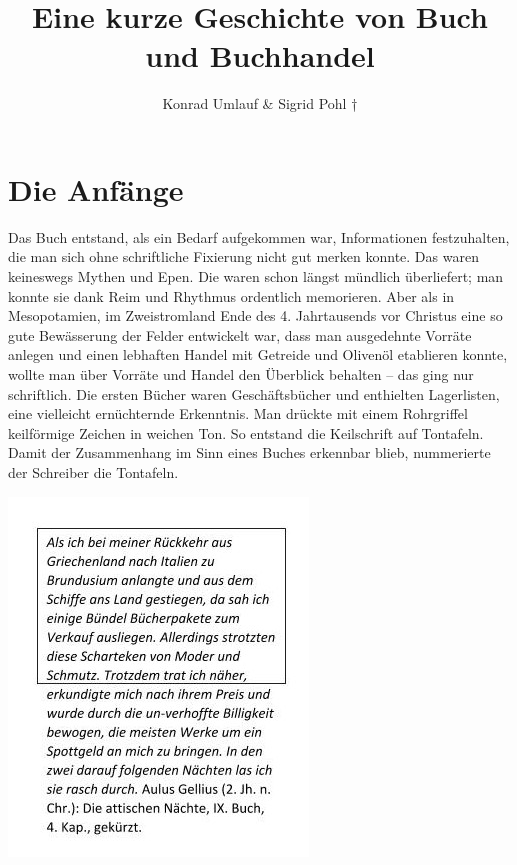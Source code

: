 \documentclass[a4paper,
fontsize=11pt,
oneside,
numbers=noperiodatend,
parskip=half-,
bibliography=totoc,
final
]{scrartcl}
\title{\LARGE{Eine kurze Geschichte von Buch und Buchhandel
}}%
\author{Konrad Umlauf \& Sigrid Pohl †} %
\date{}
\begin{document}
\maketitle
\thispagestyle{fancyplain} 


\hypertarget{die-anfuxe4nge}{%
\section{Die Anfänge}\label{die-anfuxe4nge}}

Das Buch entstand, als ein Bedarf aufgekommen war, Informationen
festzuhalten, die man sich ohne schriftliche Fixierung nicht gut merken
konnte. Das waren keineswegs Mythen und Epen. Die waren schon längst
mündlich überliefert; man konnte sie dank Reim und Rhythmus ordentlich
memorieren. Aber als in Mesopotamien, im Zweistromland Ende des 4.
Jahrtausends vor Christus eine so gute Bewässerung der Felder entwickelt
war, dass man ausgedehnte Vorräte anlegen und einen lebhaften Handel mit
Getreide und Olivenöl etablieren konnte, wollte man über Vorräte und
Handel den Überblick behalten -- das ging nur schriftlich. Die ersten
Bücher waren Geschäftsbücher und enthielten Lagerlisten, eine vielleicht
ernüchternde Erkenntnis. Man drückte mit einem Rohrgriffel keilförmige
Zeichen in weichen Ton. So entstand die Keilschrift auf Tontafeln. Damit
der Zusammenhang im Sinn eines Buches erkennbar blieb, nummerierte der
Schreiber die Tontafeln.

\begin{center}
\includegraphics{img/image1.jpg}
\end{center}
\end{document}
